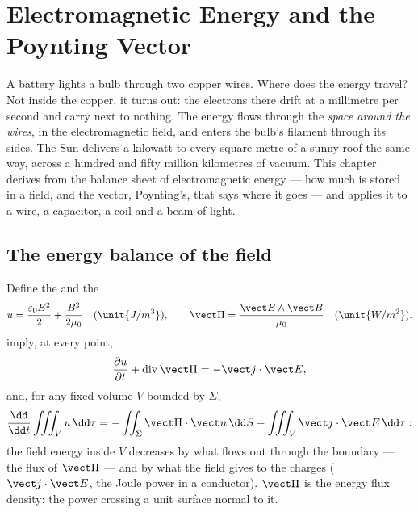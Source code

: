 \chapter{Electromagnetic Energy and the Poynting Vector}\label{ch:b2:poynting-vector}

A battery lights a bulb through two copper wires. Where does the
energy travel? Not inside the copper, it turns out: the electrons
there drift at a millimetre per second and carry next to nothing. The
energy flows through the \emph{space around the wires}, in the
electromagnetic field, and enters the bulb's filament through its
sides. The Sun delivers a kilowatt to every square metre of a sunny
roof the same way, across a hundred and fifty million kilometres of
vacuum. This chapter derives from  the balance
sheet of electromagnetic energy --- how much is stored in a field, and
the vector, Poynting's, that says where it goes --- and applies it to a
wire, a capacitor, a coil and a beam of light.

\section{The energy balance of the field}

\begin{theorem}\label{thm:b2:poynting-vector:poynting}
Define the \emph{} and the \emph{}
\[
u = \frac{\varepsilon_0E^2}2 + \frac{B^2}{2\mu_0} \quad (\unit{J/m^3}) , \qquad
\vect\Pi = \frac{\vect E\wedge\vect B}{\mu_0} \quad (\unit{W/m^2}) .
\]
 imply, at every point,
\[
\frac{\partial u}{\partial t} + \operatorname{div}\vect\Pi = -\vect j\cdot\vect E ,
\]
and, for any fixed volume $V$ bounded by $\Sigma$,
\[
\frac{\dd}{\dd t}\iiint_Vu\,\dd\tau = -\iint_\Sigma\vect\Pi\cdot\vect n\,\dd S - \iiint_V\vect j\cdot\vect E\,\dd\tau :
\]
the field energy inside $V$ decreases by what flows out through the
boundary --- the flux of $\vect\Pi$ --- and by what the field gives to
the charges ($\vect j\cdot\vect E$, the Joule power in a conductor). $\vect\Pi$
is the energy flux density: the power crossing a unit surface normal
to it.
\end{theorem}

